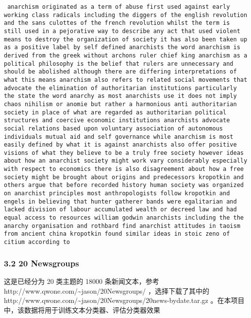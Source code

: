\documentclass[11pt]{article}
\begin{document}
\begin{verbatim}
 anarchism originated as a term of abuse first used against early working class radicals including the diggers of the english revolution and the sans culottes of the french revolution whilst the term is still used in a pejorative way to describe any act that used violent means to destroy the organization of society it has also been taken up as a positive label by self defined anarchists the word anarchism is derived from the greek without archons ruler chief king anarchism as a political philosophy is the belief that rulers are unnecessary and should be abolished although there are differing interpretations of what this means anarchism also refers to related social movements that advocate the elimination of authoritarian institutions particularly the state the word anarchy as most anarchists use it does not imply chaos nihilism or anomie but rather a harmonious anti authoritarian society in place of what are regarded as authoritarian political structures and coercive economic institutions anarchists advocate social relations based upon voluntary association of autonomous individuals mutual aid and self governance while anarchism is most easily defined by what it is against anarchists also offer positive visions of what they believe to be a truly free society however ideas about how an anarchist society might work vary considerably especially with respect to economics there is also disagreement about how a free society might be brought about origins and predecessors kropotkin and others argue that before recorded history human society was organized on anarchist principles most anthropologists follow kropotkin and engels in believing that hunter gatherer bands were egalitarian and lacked division of labour accumulated wealth or decreed law and had equal access to resources william godwin anarchists including the the anarchy organisation and rothbard find anarchist attitudes in taoism from ancient china kropotkin found similar ideas in stoic zeno of citium according to
\end{verbatim}

\subsubsection{3.2 20 Newsgroups}\label{newsgroups}

这是已经分为 20 类主题的 18000 条新闻文本，参考
http://www.qwone.com/\textasciitilde{}jason/20Newsgroups/
，选择下载了其中的
http://www.qwone.com/\textasciitilde{}jason/20Newsgroups/20news-bydate.tar.gz
。在本项目中，该数据将用于训练文本分类器、评估分类器效果
\end{document}
